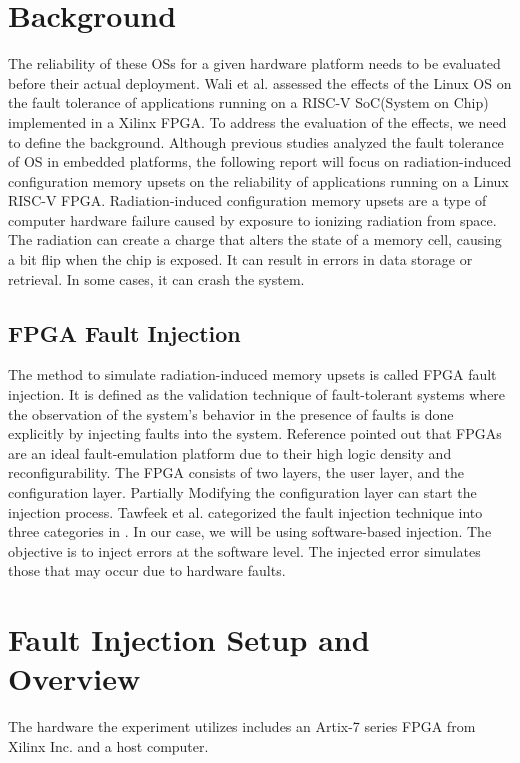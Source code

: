 \documentclass[conference]{IEEEtran}
\begin{document}
\section{Background}
The reliability of these OSs for a given hardware platform needs to be evaluated before their actual deployment.
Wali et al. \cite{b2} assessed the effects of the Linux OS on the fault tolerance of applications running on a RISC-V 
SoC(System on Chip) implemented in a Xilinx FPGA. To address the evaluation of the effects, we need to define the 
background. Although previous studies analyzed the fault tolerance of OS in embedded platforms, the following 
report will focus on radiation-induced configuration memory upsets on the reliability of applications running on 
a Linux RISC-V FPGA. Radiation-induced configuration memory upsets are a type of computer hardware failure caused 
by exposure to ionizing radiation from space. The radiation can create a charge that alters the state of a memory 
cell, causing a bit flip when the chip is exposed. It can result in errors in data storage or retrieval. In some
cases, it can crash the system. 
\subsection{FPGA Fault Injection} %
The method to simulate radiation-induced memory upsets is called FPGA fault injection. It is defined as the validation technique of fault-tolerant 
systems where the observation of the system's behavior in the presence of faults is done explicitly by 
injecting faults into the system. Reference \cite{b2} pointed out that FPGAs are an ideal fault-emulation platform 
due to their high logic density and reconfigurability. The FPGA consists of two layers, the user layer, and the configuration 
layer. Partially Modifying the configuration layer can start the injection process. Tawfeek et al. categorized the fault 
injection technique into three categories in \cite{b4}. In our case, we will be using software-based injection. 
The objective is to inject errors at the software level. The injected error simulates those that may occur due to hardware faults. 

\section{Fault Injection Setup and Overview}
The hardware the experiment utilizes includes an Artix-7 series FPGA from Xilinx Inc. and a host computer. 
\end{document}
